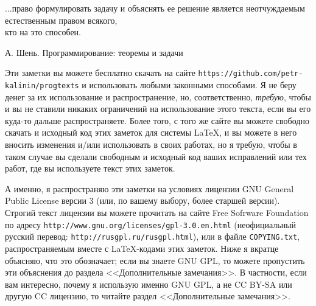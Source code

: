 

\small

\epigraph{...право формулировать задачу и объяснять ее решение является неотчуждаемым естественным правом всякого,\\ кто на это способен.}{А. Шень. Программирование: теоремы и задачи}

Эти заметки вы можете бесплатно скачать на сайте \verb`https://github.com/petr-kalinin/progtexts` и использовать любыми законными способами. Я не беру денег за их использование и распространение, но, соответственно, \textit{требую}, чтобы и вы не ставили никаких ограничений на использование этого текста, если вы его куда-то дальше распространяете. Более того, с того же сайте вы можете свободно скачать и исходный код этих заметок для системы \LaTeX, и вы можете в него вносить изменения и/или использовать в своих работах, но я требую, чтобы в таком случае вы сделали свободным и исходный код ваших исправлений или тех работ, где вы используете текст этих заметок.

А именно, я распространяю эти заметки на условиях лицензии GNU General Public License версии 3 (или, по вашему выбору, более старшей версии). Строгий текст лицензии вы можете прочитать на сайте Free Sofrware Foundation по адресу \verb`http://www.gnu.org/licenses/gpl-3.0.en.html` (неофициальный русский перевод: \verb`http://rus`\-\verb`gpl.ru/rusgpl.html`), или в файле \verb`COPYING.txt`, распространяемым вместе с \LaTeX-кодами этих заметок. Ниже я вкратце объясняю, что это обозначает; если вы знаете GNU GPL, то можете пропустить эти объяснения до раздела <<Дополнительные замечания>>. В частности, если вам интересно, почему я использую именно GNU GPL, а не CC BY-SA или другую CC лицензию, то читайте раздел <<Дополнительные замечания>>.

